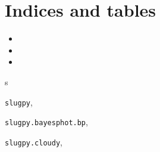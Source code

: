 \documentclass[letterpaper,10pt,english]{sphinxmanual}
\begin{document}
\chapter{Indices and tables}
\label{index:indices-and-tables}\begin{itemize}
\item {} 

\item {} 

\item {} 

\end{itemize}


\renewcommand{\indexname}{Python Module Index}
\begin{theindex}
\def\bigletter#1{{\Large\sffamily#1}\nopagebreak\vspace{1mm}}
\bigletter{s}
\item {\texttt{slugpy}}, \pageref{slugpy:module-slugpy}
\item {\texttt{slugpy.bayesphot.bp}}, \pageref{bayesphot:module-slugpy.bayesphot.bp}
\item {\texttt{slugpy.cloudy}}, \pageref{cloudy:module-slugpy.cloudy}
\end{theindex}

\renewcommand{\indexname}{Index}
\printindex
\end{document}
